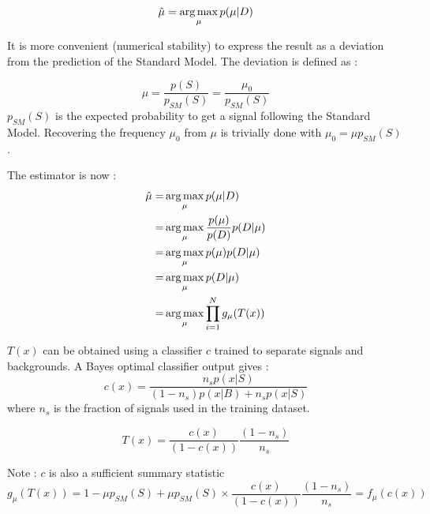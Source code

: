 \begin{equation}
	\hat \mu = \operatorname*{arg\,max}_\mu p(\mu | D)
\end{equation}

It is more convenient (numerical stability) to express the result as a deviation from the prediction of the Standard Model.
The deviation is defined as :

\begin{equation}
	\mu = \frac{p(S)}{p_{SM}(S)} = \frac{\mu_0}{p_{SM}(S)}
\end{equation}
$p_{SM}(S)$ is the expected probability to get a signal following the Standard Model.
Recovering the frequency $\mu_0$ from $\mu$ is trivially done with $\mu_0 = \mu p_{SM}(S)$.

The estimator is now :
\begin{align}
	\hat\mu =& \operatorname*{arg\,max}_\mu p(\mu | D) \\
	     =& \operatorname*{arg\,max}_\mu \frac{p(\mu)}{p(D)} p(D | \mu) \\
	     =& \operatorname*{arg\,max}_\mu p(\mu) p(D | \mu) \\
	     =& \operatorname*{arg\,max}_\mu  p(D | \mu) \\
	     =& \operatorname*{arg\,max}_\mu  \prod_{i=1}^N g_\mu(T(x)) \\
\end{align}


$T(x)$ can be obtained using a classifier $c$ trained to separate signals and backgrounds.
A Bayes optimal classifier output gives :
\begin{equation}
	c(x) = \frac{n_s p(x|S)}{(1-n_s) p(x|B) + n_s p(x|S)}
\end{equation}
where $n_s$ is the fraction of signals used in the training dataset.

\begin{equation}
	T(x) = \frac{c(x)}{(1-c(x))} \frac{(1-n_s)}{n_s} 
\end{equation}


Note : $c$ is also a sufficient summary statistic
\begin{equation}
	g_\mu(T(x)) = 1 - \mu p_{SM}(S) + \mu p_{SM}(S) \times \frac{c(x)}{(1-c(x))} \frac{(1-n_s)}{n_s} = f_\mu(c(x))
\end{equation}






